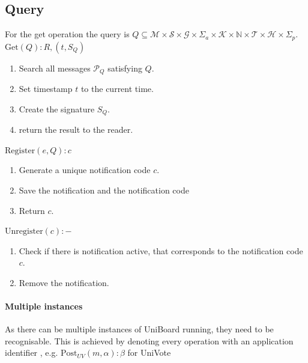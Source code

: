 \documentclass[bibtotoc,halfparskip,oneside]{scrreprt}
\begin{document}
\subsection{Query}
For the get operation the query is  $Q\subseteq\mathcal{M}\times\mathcal{S}\times\mathcal{G}\times\Sigma_a\times\mathcal{K}\times\mathbb{N}\times\mathcal{T}\times\mathcal{H}\times\Sigma_p$. \newline\newline
$\mathrm{Get}(Q): R, (t, S_Q)$
\begin{enumerate}
	\item Search all messages $\mathcal{P}_Q$ satisfying $Q$.
	\item Set timestamp $t$ to the current time.
	\item Create the signature $S_Q$.
	\item return the result to the reader.
\end{enumerate}
$\mathrm{Register}(e, Q): c$
\begin{enumerate}
	\item Generate a unique notification code $c$.
	\item Save the notification and the notification code
	\item Return $c$.
\end{enumerate}
$\mathrm{Unregister}(c): -$
\begin{enumerate}
	\item Check if there is notification active, that corresponds to the notification code $c$.
	\item Remove the notification.
\end{enumerate}

\paragraph*{Multiple instances}
As there can be multiple instances of UniBoard running, they need to be recognisable. This is achieved by denoting every operation with an application identifier , e.g. $\mathrm{Post}_{UV}(m,\alpha):\beta$ for UniVote 


\end{document}
